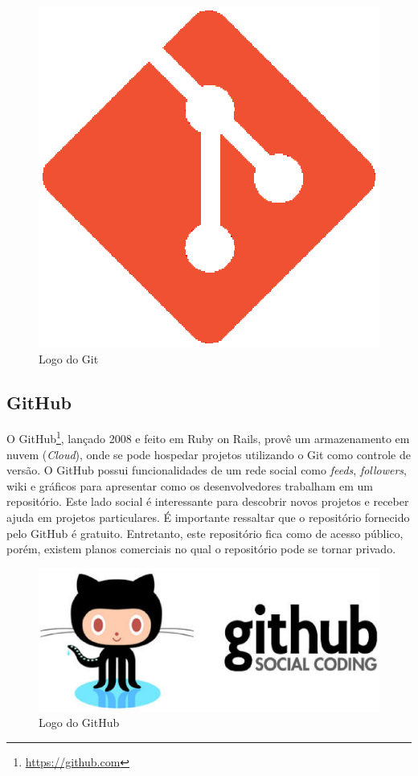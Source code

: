 \begin{figure}[!h]
	\centering
	\includegraphics[scale=0.35]{figuras/capitulo3/git.eps}
	\caption{Logo do Git}
	\label{git}
\end{figure}

\subsection{GitHub}

O GitHub\footnote{\url{https://github.com}}, lançado 2008 e feito em Ruby on Rails, provê um armazenamento em nuvem (\textit{Cloud}), onde se pode hospedar projetos utilizando o Git como controle de versão. O GitHub possui funcionalidades de um rede social como \textit{feeds}, \textit{followers}, wiki e gráficos para apresentar como os desenvolvedores trabalham em um repositório. Este lado social é interessante para descobrir novos projetos e receber ajuda em projetos particulares. É importante ressaltar que o repositório fornecido pelo GitHub é gratuito. Entretanto, este repositório fica como de acesso público, porém, existem planos comerciais no qual o repositório pode se tornar privado.

\begin{figure}[!h]
	\centering
	\includegraphics[scale=0.35]{figuras/capitulo3/github.eps}
	\caption{Logo do GitHub}
	\label{github}
\end{figure}

